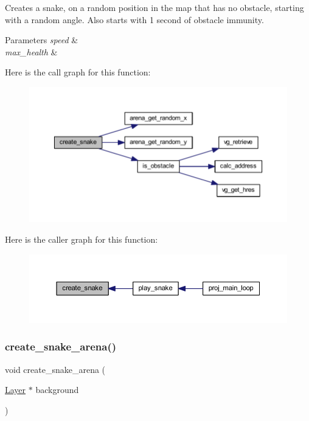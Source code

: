 Creates a snake, on a random position in the map that has no obstacle, starting with a random angle. Also starts with 1 second of obstacle immunity. 


\begin{DoxyParams}{Parameters}
{\em speed} & \\
\hline
{\em max\+\_\+health} & \\
\hline
\end{DoxyParams}
Here is the call graph for this function\+:\nopagebreak
\begin{figure}[H]
\begin{center}
\leavevmode
\includegraphics[width=350pt]{group__snake_gadcb5c41dcab72f6e0a7cd5d037c0d744_cgraph}
\end{center}
\end{figure}
Here is the caller graph for this function\+:\nopagebreak
\begin{figure}[H]
\begin{center}
\leavevmode
\includegraphics[width=350pt]{group__snake_gadcb5c41dcab72f6e0a7cd5d037c0d744_icgraph}
\end{center}
\end{figure}
\mbox{\label{group__snake_gae7016570a88c488abe2dabb31467daf8}} 
\subsubsection{\texorpdfstring{create\+\_\+snake\+\_\+arena()}{create\_snake\_arena()}}
{\footnotesize\ttfamily void create\+\_\+snake\+\_\+arena (\begin{DoxyParamCaption}\item[{\mbox{\hyperlink{struct_layer}{Layer}} $\ast$}]{background }\end{DoxyParamCaption})}



